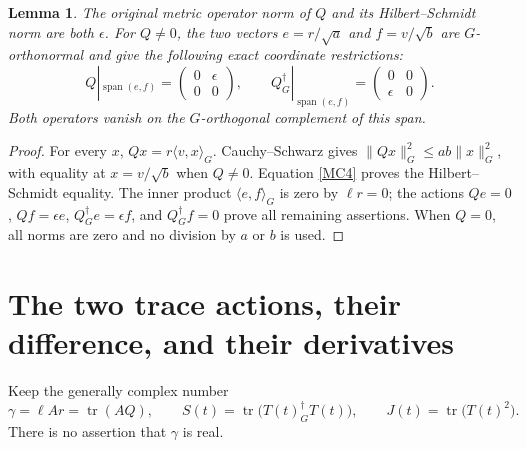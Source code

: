 \documentclass[11pt]{article}
\newtheorem{lemma}{Lemma}
\newcommand{\tr}{\operatorname{tr}}
\newcommand{\adj}{\dagger_G}
\begin{document}
\begin{lemma}
The original metric operator norm of \(Q\) and its Hilbert--Schmidt norm
are both \(\epsilon\). For \(Q\ne0\), the two vectors
\(e=r/\sqrt a\) and \(f=v/\sqrt b\) are \(G\)-orthonormal and give
the following exact coordinate restrictions:
\begin{equation}
 Q|_{\operatorname{span}(e,f)}
 =\begin{pmatrix}0&\epsilon\\0&0\end{pmatrix},\qquad
 Q^\adj|_{\operatorname{span}(e,f)}
 =\begin{pmatrix}0&0\\\epsilon&0\end{pmatrix}.
 \tag{MC5}\label{MC5}
\end{equation}
Both operators vanish on the \(G\)-orthogonal complement of this span.
\end{lemma}
\begin{proof}
For every \(x\), \(Qx=r\langle v,x\rangle_G\). Cauchy--Schwarz gives
\(\|Qx\|_G^2\le ab\|x\|_G^2\), with equality at \(x=v/\sqrt b\)
when \(Q\ne0\). Equation \eqref{MC4} proves the Hilbert--Schmidt equality.
The inner product \(\langle e,f\rangle_G\) is zero by \(\ell r=0\);
the actions \(Qe=0\), \(Qf=\epsilon e\), \(Q^\adj e=\epsilon f\),
and \(Q^\adj f=0\) prove all remaining assertions. When \(Q=0\), all
norms are zero and no division by \(a\) or \(b\) is used.
\end{proof}

\section{The two trace actions, their difference, and their derivatives}

Keep the generally complex number
\begin{equation}
 \gamma=\ell Ar=\tr(AQ),\qquad
 S(t)=\tr\bigl(T(t)^\adj T(t)\bigr),\qquad
 J(t)=\tr\bigl(T(t)^2\bigr).
 \tag{MC6}\label{MC6}
\end{equation}
There is no assertion that \(\gamma\) is real.
\end{document}

